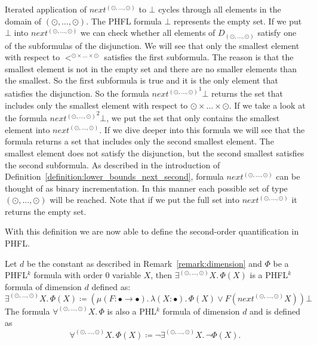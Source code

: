 \begin{remark}
\label{remark:lower_bounds_next_second}
	Iterated application of $next^{(\odot, \dots, \odot)}$ to $\bot$ cycles through all elements in the domain of $(\odot, \dots, \odot)$. The PHFL formula $\bot$ represents the empty set. If we put $\bot$ into $next^{(\odot, \dots, \odot)}$ we can check whether all elements of $D_{(\odot, \dots, \odot)}$ satisfy one 
	of the subformulas of the disjunction. We will see that only the smallest element with respect to $<^{\odot\times\dots\times\odot}$ satisfies the first subformula. The reason is that the smallest element is not in the empty set and there are no smaller elements than the smallest.
	So the first subformula is true and it is the only element that satisfies the disjunction. So the formula ${next^{(\odot, \dots, \odot)}}^1 \bot$ returns the set that includes only the smallest 
	element with respect to $\odot \times \dots \times \odot$. If we take a look at the formula ${next^{(\odot, \dots, \odot)}}^2 \bot$, we put the set that only contains the smallest element into 
	$next^{(\odot, \dots, \odot)}$. If we dive deeper into this formula we will see that the formula returns a set that includes only the second smallest element. The smallest element does not 
	satisfy the disjunction, but the second smallest satisfies the second subformula. As described in the introduction of Definition~\ref{definition:lower_bounds_next_second}, formula $next^{(\odot, 
	\dots, \odot)}$ can be thought of as binary incrementation. In this manner each possible set of type $(\odot, \dots, \odot)$ will be reached. Note that if we put the full set into $next^{(\odot, 
	\dots, \odot)}$ it returns the empty set.
\end{remark}

With this definition we are now able to define the second-order quantification in PHFL.

\begin{definition}
    \label{definition:existential_quantification_second}
    Let $d$ be the constant as described in Remark~\ref{remark:dimension} and $\Phi$ be a PHFL$^k$ formula with order $0$ variable $X$, then $\exists^{(\odot, \dots, \odot)}X .\,\Phi(X)$
    is a PHFL$^k$ formula of dimension $d$ defined as:
    \[\exists^{(\odot, \dots, \odot)}X.\, \Phi(X) \coloneqq (\mu (F \colon \bullet \rightarrow \bullet).\, \lambda (X
    \colon \bullet).\, \Phi(X) \vee F(next^{(\odot, \dots, \odot)} X)) \bot
    \]
    The formula $\forall^{(\odot, \dots, \odot)}X.\,\Phi$ is also a PHL$^k$ formula of dimension $d$ and is defined as
    \[\forall^{(\odot, \dots, \odot)}X.\,\Phi(X) \coloneqq \neg \exists^{(\odot, \dots, \odot)}X .\,\neg\Phi(X).\]
\end{definition}

